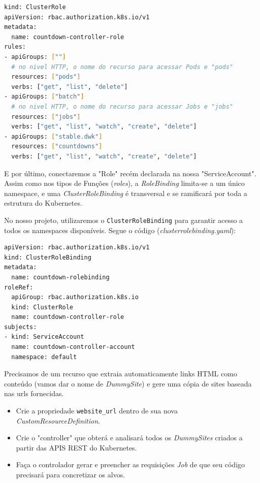\documentclass[11pt,a4paper]{article}
\begin{document}
\begin{lstlisting}[language=bash]
kind: ClusterRole
apiVersion: rbac.authorization.k8s.io/v1
metadata:
  name: countdown-controller-role
rules:
- apiGroups: [""]
  # no nivel HTTP, o nome do recurso para acessar Pods e "pods"
  resources: ["pods"]
  verbs: ["get", "list", "delete"]
- apiGroups: ["batch"]
  # no nivel HTTP, o nome do recurso para acessar Jobs e "jobs"
  resources: ["jobs"]
  verbs: ["get", "list", "watch", "create", "delete"]
- apiGroups: ["stable.dwk"]
  resources: ["countdowns"]
  verbs: ["get", "list", "watch", "create", "delete"]
\end{lstlisting}

E por último, conectaremos a "Role" recém declarada na nossa "ServiceAccount". Assim como nos tipos de Funções (\textit{roles}), a \textit{RoleBinding} limita-se a um único namespace, e uma \textit{ClusterRoleBinding} é transversal e se ramificará por toda a estrutura do Kubernetes.

No nosso projeto, utilizaremos o \texttt{ClusterRoleBinding} para garantir acesso a todos os namespaces disponíveis. Segue o código (\textit{clusterrolebinding.yaml}):

\begin{lstlisting}[language=bash]
apiVersion: rbac.authorization.k8s.io/v1
kind: ClusterRoleBinding
metadata:
  name: countdown-rolebinding
roleRef:
  apiGroup: rbac.authorization.k8s.io
  kind: ClusterRole
  name: countdown-controller-role
subjects:
- kind: ServiceAccount
  name: countdown-controller-account
  namespace: default
\end{lstlisting}

\begin{tcolorbox}[colback=blue!5!white,colframe=blue!75!black,title=Exercício 5.1: Faça você mesmo um CRD e Controller]
Precisamos de um recurso que extraia automaticamente links HTML como conteúdo (vamos dar o nome de \textit{DummySite}) e gere uma cópia de sites baseada nas urls fornecidas.
\begin{itemize}
    \item Crie a propriedade \texttt{website\_url} dentro de sua nova \textit{CustomResourceDefinition}.
    \item Crie o "controller" que obterá e analisará todos os \textit{DummySites} criados a partir das APIS REST do Kubernetes.
    \item Faça o controlador gerar e preencher as requisições \textit{Job} de que seu código precisará para concretizar os alvos.
\end{itemize}
\end{tcolorbox}
\end{document}
